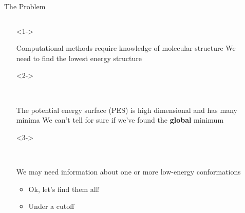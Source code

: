 \documentclass[10pt]{beamer}
\begin{document}
\begin{frame}[fragile]{The Problem}
    \begin{columns}{}
        \begin{column}{0.6\textwidth}
            \begin{itemize}
              \item[]<1->{
             	\begin{block}{Computational methods require knowledge of molecular structure}
                    We need to find the lowest energy structure
             	\end{block}
              }
              \item[]<2->{
             	~
             	\begin{block}{The potential energy surface (PES) is high dimensional and has many minima}
                    We can't tell for sure if we've found the \alert{\textbf{global}} minimum
             	\end{block}
              }
              \item[]<3->{
             	~
            	\begin{block}{We may need information about one or more low-energy conformations}
                    \begin{itemize}[leftmargin=*]
                        \item<3-> Ok, let's find them all!
                        \item<4-> Under a cutoff
                    \end{itemize}
            	\end{block}
              }
            \end{itemize}
           \end{column}
           \begin{column}{0.45\textwidth}
		    \begin{overprint}

\end{overprint}
\end{column}
\end{columns}
\end{frame}
\end{document}
